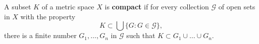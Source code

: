 A subset $K$ of a metric space $X$ is \textbf{compact} if for every collection $\mathcal{G}$ of open sets in $X$ with the property
$$K \subset \bigcup \{G: G \in \mathcal{G}\},$$
there is a finite number $G_1, \ldots, G_n$ in $\mathcal{G}$ such that $K \subset G_1 \cup \ldots \cup G_n$.
